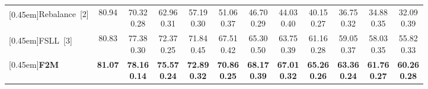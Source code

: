 \documentclass{article}
\begin{document}
\begin{table*}[ht]
{\begin{tabular}{lccccccccccc}
  \rule{0pt}{5ex}\multirow{1}{*}[0.45em]{Rebalance~[2]\textsuperscript{} }   & \multirow{1}{*}[0.5em]{80.94} & \shortstack[r]{70.32 \\   0.28} & \shortstack[r]{62.96 \\   0.31} & \shortstack[r]{57.19 \\   0.30} & \shortstack[r]{51.06 \\   0.37} & \shortstack[r]{46.70 \\   0.29} & \shortstack[r]{44.03 \\   0.40} & \shortstack[r]{40.15 \\   0.27} & \shortstack[r]{36.75 \\   0.32} & \shortstack[r]{34.88 \\   0.35} & \shortstack[r]{32.09 \\   0.39}\\
  \rule{0pt}{5ex}\multirow{1}{*}[0.45em]{FSLL~[3]\textsuperscript{} }       & \multirow{1}{*}[0.5em]{80.83} & \shortstack[r]{77.38 \\   0.30} & \shortstack[r]{72.37 \\   0.25} & \shortstack[r]{71.84 \\   0.45} & \shortstack[r]{67.51 \\   0.42} & \shortstack[r]{65.30 \\   0.50} & \shortstack[r]{63.75 \\   0.39} & \shortstack[r]{61.16 \\   0.28} & \shortstack[r]{59.05 \\   0.37} & \shortstack[r]{58.03 \\   0.35} & \shortstack[r]{55.82 \\   0.33}\\
  \rule{0pt}{5ex}\multirow{1}{*}[0.45em]{\textbf{F2M}}                                   & \multirow{1}{*}[0.5em]{\textbf{81.07}} & \shortstack[r]{\textbf{78.16} \\  \textbf{0.14}} & \shortstack[r]{\textbf{75.57} \\  \textbf{0.24}} & \shortstack[r]{\textbf{72.89} \\  \textbf{0.32}} & \shortstack[r]{\textbf{70.86} \\  \textbf{0.25}} & \shortstack[r]{\textbf{68.17} \\  \textbf{0.39}} & \shortstack[r]{\textbf{67.01} \\  \textbf{0.32}} & \shortstack[r]{\textbf{65.26} \\  \textbf{0.26}} & \shortstack[r]{\textbf{63.36} \\  \textbf{0.24}} & \shortstack[r]{\textbf{61.76} \\  \textbf{0.27}}   & \shortstack[r]{\textbf{60.26} \\  \textbf{0.28}} \\
  \bottomrule
\end{tabular}
}
\end{table*} 
\end{document}
